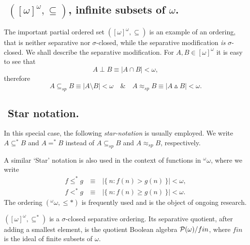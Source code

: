 

\subsection{${}$ \hspace{-1em}$([\omega]^\omega,\subseteq)$, infinite subsets of $\omega$.}

The important partial ordered set $([\omega]^\omega,\subseteq)$ is an example of an ordering, that is neither separative nor $\sigma$-closed, while the
separative modification \emph{is} $\sigma$-closed. We shall describe the separative modification. For $A,B\in[\omega]^\omega$ it is easy to see that
$$ %
A\perp B\equiv |A\cap B|<\omega,
$$ %
therefore
$$ %
A\subseteq_{sp} B \equiv |A\setminus B|<\omega\quad\&\quad A \approx_{sp} B\equiv |A \vartriangle  B|<\omega.
$$ %

\subsection{${}$ \hspace{-1em}Star notation.}
In this special case, the following \emph{star-notation} is usually employed.
We write $A\subseteq^* B$ and $A=^*B$ instead of
$A\subseteq_{sp} B$ and $A\approx_{sp} B$, respectively.

\smallskip

\noindent A similar `Star' notation is also used in the context of functions in ${}^\omega \omega$, where we write
\begin{eqnarray*}
 f \leq^* g \ & \equiv & \ |\{\ n : f(n) > g(n) \ \}| < \omega, \\
f <^* g \ & \equiv & \ |\{\ n : f(n) \geq g(n) \ \}|< \omega.
\end{eqnarray*}
The ordering $({}^\omega \omega,  \leq *)$ is frequently used and is the object of ongoing research.

\begin{fact}
$([\omega]^\omega,\subseteq^*)$ is a $\sigma$-closed separative ordering.
Its separative quotient, after adding a smallest element,
is the quotient Boolean algebra ${{\mathcal P}}(\omega)/fin$, where $fin$ is the
ideal of finite subsets of $\omega$.
\end{fact}


